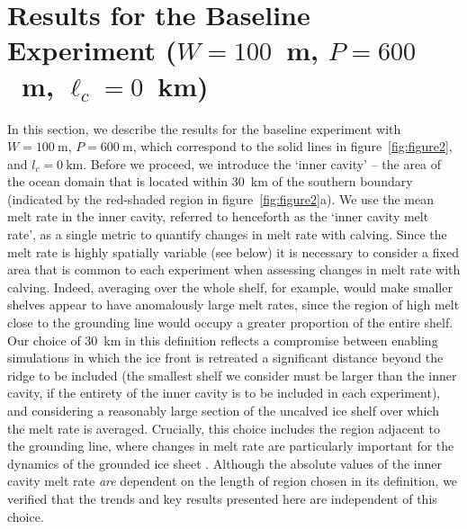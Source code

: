 \documentclass[draft]{agujournal2019}
\begin{document}
\section{Results for the Baseline Experiment ($W=100$~m, $P=600$~m, $\ell_c = 0$~km)}\label{S:Baseline}
In this section, we describe the results for the baseline experiment with $W=100~\text{m}$, $P=600~\text{m}$, which correspond to the solid lines in figure~\ref{fig:figure2}, and $l_c=0~\text{km}$. %
Before we proceed, we introduce the `inner cavity' -- the area of the ocean domain that is located within 30~km of the southern boundary (indicated by the red-shaded region in figure~\ref{fig:figure2}a). We use the mean melt rate in the inner cavity, referred to henceforth as the `inner cavity melt rate', as a single metric to quantify changes in melt rate with calving. Since the melt rate is highly spatially variable (see below) it is necessary to consider a fixed area that is common to each experiment when assessing changes in melt rate with calving. Indeed, averaging over the whole shelf, for example, would make smaller shelves appear to have anomalously large melt rates, since the region of high melt close to the grounding line would occupy a greater proportion of the entire shelf. Our choice of 30~km in this definition reflects a compromise between enabling simulations in which the ice front is retreated a significant distance beyond the ridge to be included (the smallest shelf we consider must be larger than the inner cavity, if the entirety of the inner cavity is to be included in each experiment), and considering a reasonably large section of the uncalved ice shelf over which the melt rate is averaged. Crucially, this choice includes the region adjacent to the grounding line, where changes in melt rate are particularly important for the dynamics of the grounded ice sheet \cite{Seroussi2014Cryo, Athern2017GRL}. Although the absolute values of the inner cavity melt rate \textit{are} dependent on the length of region chosen in its definition, we verified that the trends and key results presented here are independent of this choice.
\end{document}
